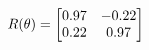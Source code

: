 \documentclass[preview]{standalone}
\begin{document}
\begin{align*}
\special{dvisvgm:raw <g id='unique000'>}R(\theta) = \begin{bmatrix}0.97 & -0.22\\0.22 & 0.97\end{bmatrix}\special{dvisvgm:raw </g>}
\end{align*}
\end{document}
